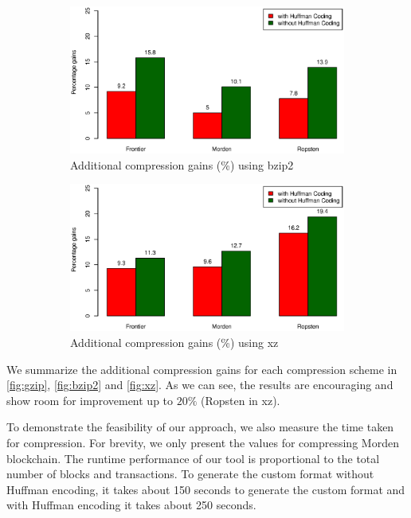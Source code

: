 \begin{figure}[H]
\begin{subfigure}{0.45\textwidth}
	\includegraphics[width=\textwidth]{plots/bzip2.eps}
	\caption{Additional compression gains (\%) using bzip2}
	\label{fig:bzip2}
\end{subfigure}
\begin{subfigure}{0.45\textwidth}
	\includegraphics[width=\textwidth]{plots/xz.eps}
	\caption{Additional compression gains (\%) using xz}
	\label{fig:xz}
\end{subfigure}
\caption{ }
\end{figure}
We summarize the additional compression gains for each compression scheme in \autoref{fig:gzip}, \autoref{fig:bzip2} and \autoref{fig:xz}.
As we can see, the results are encouraging and show room for improvement up to $20\%$ (Ropsten in xz).

To demonstrate the feasibility of our approach, we also measure the time taken for compression. 
For brevity, we only present the values for compressing Morden blockchain.
The runtime performance of our tool is proportional to the total number of blocks and transactions. 
To generate the custom format without Huffman encoding, it takes about 150 seconds to generate the custom format and with Huffman encoding it takes about 250 seconds. 



